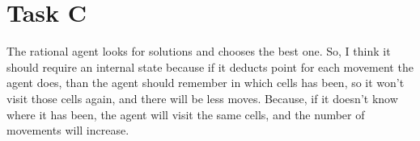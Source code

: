 
\section{Task C}

The rational agent looks for solutions and chooses the best one. So, I think it
should require an internal state because if it deducts point for each movement
the agent does, than the agent should remember in which cells has been, so it
won't visit those cells again, and there will be less moves. Because, if it
doesn't know where it has been, the agent will visit the same cells, and the
number of movements will increase.

